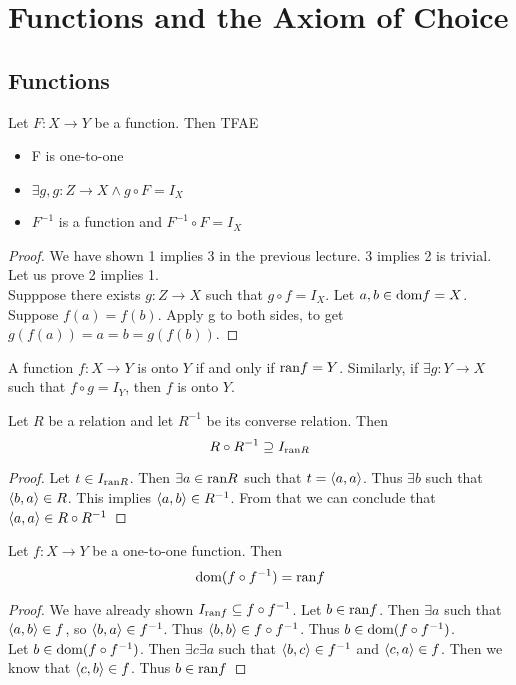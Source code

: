 
\section{Functions and the Axiom of Choice}
\subsection{Functions}
\begin{thm}[1-1 Functions]
    Let $F: X \to Y$ be a function. Then TFAE
    \begin{itemize}
        \item F is one-to-one
        \item $\exists g, g: Z \to X \wedge g \circ F = I_X$
        \item $F^{-1}$ is a function and $F^{-1}\circ F = I_X$
    \end{itemize}
\end{thm}
\begin{proof}
We have shown 1 implies 3 in the previous lecture. 3 implies 2 is trivial. Let us prove
2 implies 1.\\
Supppose there exists $g: Z \to X$ such that $g \circ f = I_X$. Let $a, b \in \text{dom} f = X$.
Suppose $f(a) = f(b)$. Apply g to both sides, to get $g(f(a)) = a = b = g(f(b))$.
\end{proof}
\begin{defn}[Onto]
A function $f: X \to Y$ is onto $Y$ if and only if $\text{ran} f = Y$. Similarly,
if $\exists g: Y \to X$ such that $f \circ g = I_Y$, then $f$ is onto $Y$.
\end{defn}
\begin{prop}
Let $R$ be a relation and let $R^{-1}$ be its converse relation. Then 
\[R \circ R^{-1} \supseteq I_{\text{ran} R}\]
\end{prop}
\begin{proof}
    Let $t \in I_{\text{ran} R}$. Then $\exists a \in \text{ran} R$ such that $t = \langle a, a\rangle$.
    Thus $\exists b$ such that $\langle b, a\rangle \in R$. This implies $\langle a, b\rangle \in R^{-1}$. 
    From that we can conclude that $\langle a, a\rangle \in R \circ R^{-1}$
\end{proof}
\begin{prop}
Let $f: X \to Y$ be a one-to-one function. Then 
\[\text{dom} (f \circ f^{-1}) = \text{ran} f\]
\end{prop}
\begin{proof}
    We have already shown $I_{\text{ran} f} \subseteq f \circ f^{-1}$.
    Let $b \in \text{ran} f$. Then $\exists a$ such that $\langle a, b\rangle \in f$, so $\langle b, a\rangle \in f^{-1}$.
    Thus $\langle b, b\rangle \in f \circ f^{-1}$. Thus $b \in \text{dom} (f \circ f^{-1})$.\\
    Let $b \in \text{dom} (f \circ f^{-1})$. Then $\exists c \exists a$ such that $\langle b, c\rangle \in f^{-1}$ and
    $\langle c, a\rangle \in f$. Then we know that $\langle c, b\rangle \in f$. Thus $b \in \text{ran} f$
\end{proof}

